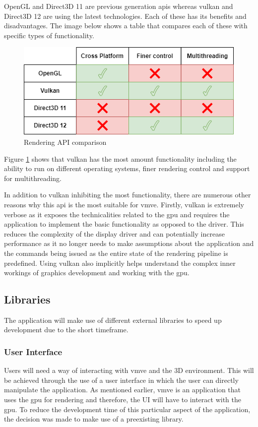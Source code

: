 \documentclass[11pt]{article}
\begin{document}
OpenGL and Direct3D 11 are previous generation \glspl*{api} whereas \gls*{vulkan}
and Direct3D 12 are using the latest technologies. Each of these has its
benefits and disadvantages. The image below shows a table that compares each of
these with specific types of functionality. 
\begin{figure}[H]
  \centering
  \includegraphics[width=\textwidth]{images/api_comparison.png}
  \caption{Rendering API comparison}
  \label{fig:api_comparison}
\end{figure}

Figure \ref{fig:api_comparison} shows that \gls*{vulkan} has the most amount
functionality including the ability to run on different operating systems, 
finer rendering control and support for multithreading.

In addition to \gls*{vulkan} inhibiting the most functionality, there are
numerous other reasons why this \gls*{api} is the most suitable for \gls*{vmve}.
Firstly, \gls*{vulkan} is extremely verbose as it exposes the technicalities
related to the \gls*{gpu} and requires the application to implement the basic
functionality as opposed to the driver. This reduces the complexity of the
display driver and can potentially increase performance as it no longer needs to
make assumptions about the application and the commands being issued as the
entire state of the rendering pipeline is predefined. Using \gls*{vulkan} also
implicitly helps understand the complex inner workings of graphics development
and working with the \gls*{gpu}.

\subsection{Libraries}
The application will make use of different external libraries to speed up 
development due to the short timeframe.

\subsubsection{User Interface}
Users will need a way of interacting with \gls*{vmve} and the 3D environment.
This will be achieved through the use of a user interface in which the user can
directly manipulate the application. As mentioned earlier, \gls*{vmve} is an
application that uses the \gls*{gpu} for rendering and therefore, the UI will
have to interact with the \gls*{gpu}. To reduce the development time of this
particular aspect of the application, the decision was made to make use of a
preexisting library.
\end{document}
